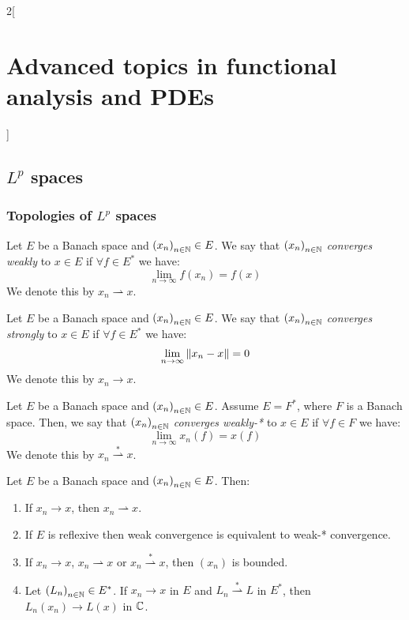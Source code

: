 \documentclass[../../../main_math.tex]{subfiles}
\begin{document}
\begin{multicols}{2}[\section{Advanced topics in functional analysis and PDEs}]
  \subsection{\texorpdfstring{$L^p$}{Lp} spaces}
  \subsubsection{Topologies of \texorpdfstring{$L^p$}{Lp} spaces}
  \begin{definition}
    Let $E$ be a Banach space and ${(x_n)}_{n\in\mathbb{N}}\in E$. We say that ${(x_n)}_{n\in\mathbb{N}}$ \emph{converges weakly} to $x\in E$ if $\forall f\in E^*$ we have:
    $$
      \lim_{n\to\infty}{f(x_n)}=f(x)
    $$
    We denote this by $x_n\rightharpoonup x$.
  \end{definition}
  \begin{definition}
    Let $E$ be a Banach space and ${(x_n)}_{n\in\mathbb{N}}\in E$. We say that ${(x_n)}_{n\in\mathbb{N}}$ \emph{converges strongly} to $x\in E$ if $\forall f\in E^*$ we have:
    $$
      \lim_{n\to\infty}{\left\|x_n-x\right\|}=0
    $$
    We denote this by $x_n\to x$.
  \end{definition}
  \begin{definition}
    Let $E$ be a Banach space and ${(x_n)}_{n\in\mathbb{N}}\in E$. Assume $E=F^*$, where $F$ is a Banach space. Then, we say that ${(x_n)}_{n\in\mathbb{N}}$ \emph{converges weakly-*} to $x\in E$ if $\forall f\in F$ we have:
    $$
      \lim_{n\to\infty}{x_n(f)}=x(f)
    $$
    We denote this by $x_n\overset{*}\rightharpoonup x$.
  \end{definition}
  \begin{theorem}
    Let $E$ be a Banach space and ${(x_n)}_{n\in\mathbb{N}}\in E$. Then:
    \begin{enumerate}
      \item If $x_n\to x$, then $x_n\rightharpoonup x$.
      \item If $E$ is reflexive then weak convergence is equivalent to weak-* convergence.
      \item If $x_n\to x$, $x_n\rightharpoonup x$ or $x_n\overset{*}\rightharpoonup x$, then $(x_n)$ is bounded.
      \item Let ${(L_n)}_{n\in\mathbb{N}}\in E^*$. If $x_n\to x$ in $E$ and $L_n\overset{*}\rightharpoonup L$ in $E^*$, then $L_n(x_n)\to L(x)$ in $\mathbb{C}$.

\end{enumerate}
\end{theorem}
\end{multicols}
\end{document}
